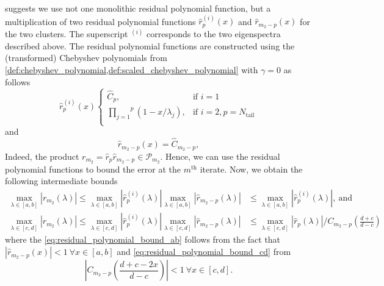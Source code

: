 \citeauthor{cg_sharpened_convrate_Axelsson1976} suggests we use not one monolithic residual polynomial function, but a multiplication of two residual polynomial functions $\hat{r}^{(i)}_p(x)$ and $\hat{r}_{m_2-p}(x)$ for the two clusters. The superscript $^{(i)}$ corresponds to the two eigenspectra described above. The residual polynomial functions are constructed using the (transformed) Chebyshev polynomials from \cref{def:chebyshev_polynomial,def:scaled_chebyshev_polynomial} with $\gamma = 0$ as follows
\begin{equation}
    \hat{r}^{(i)}_p (x)
    \begin{cases}
        \hat{C}_p                                            , & \text{if } i = 1                      \\
        \overset{p}{\underset{j=1}{\prod}} (1 - x/\lambda_j) , & \text{if } i = 2, p = N_{\text{tail}} \\
    \end{cases}
    \label{eq:residual_polynomial_rm}
\end{equation}
and
\begin{equation}
    \hat{r}_{{m_2}-p} (x) = \hat{C}_{m_2-p},
    \label{eq:residual_polynomial_rpm}
\end{equation}
Indeed, the product $r_{m_2} = \hat{r}_p \hat{r}_{m_2-p} \in \mathcal{P}_{m_2}$. Hence, we can use the residual polynomial functions to bound the error at the $m^{\text{th}}$ iterate. Now, we obtain the following intermediate bounds
\begin{subequations}
    \begin{align}
        \max_{\lambda \in [a,b]} |r_{m_2}(\lambda)| \leq \max_{\lambda \in [a,b]} |\hat{r}^{(i)}_p(\lambda)| \max_{\lambda \in [a,b]} |\hat{r}_{m_2-p}(\lambda)| & \leq \max_{\lambda \in [a,b]} |\hat{r}^{(i)}_p(\lambda)|, \ \text{and} \label{eq:residual_polynomial_bound_ab}                     \\
        \max_{\lambda \in [c,d]} |r_{m_2}(\lambda)| \leq \max_{\lambda \in [c,d]} |\hat{r}^{(i)}_p(\lambda)| \max_{\lambda \in [c,d]} |\hat{r}_{m_2-p}(\lambda)| & \leq \max_{\lambda \in [c,d]} |\hat{r}_{p}(\lambda)|/C_{m_2-p}\left(\frac{d+c}{d-c}\right) \label{eq:residual_polynomial_bound_cd}
    \end{align}
\end{subequations}
where the \cref{eq:residual_polynomial_bound_ab} follows from the fact that $|\hat{r}_{m_2-p}(x)| < 1 \ \forall x \in [a,b]$ and \cref{eq:residual_polynomial_bound_cd} from
\[
    \left|C_{m_2-p}\left(\frac{d+c -2x}{d-c}\right)\right| < 1 \ \forall x \in [c,d].
\]

